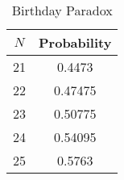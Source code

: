 \begin{table}[h]
\centering
\begin{tabular}{cc}
\hline\hline
$N$ & Probability \\
\hline
21 & 0.4473 \\
22 & 0.47475 \\
23 & 0.50775 \\
24 & 0.54095 \\
25 & 0.5763 \\
\hline\hline
\end{tabular}
\label{tb2}
\caption{Birthday Paradox}
\end{table}
